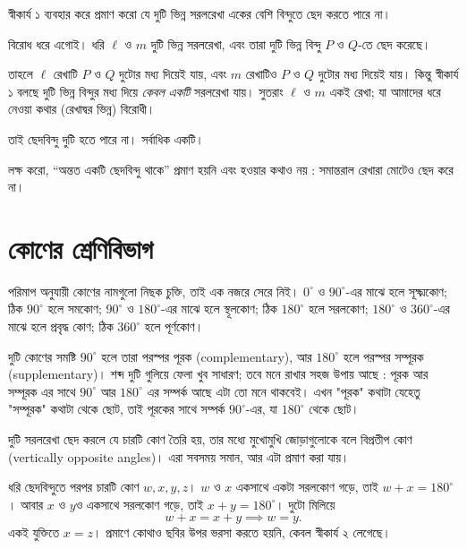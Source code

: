 \documentclass[11pt]{article}
\begin{document}
 স্বীকার্য ১ ব্যবহার করে প্রমাণ করো যে দুটি ভিন্ন সরলরেখা একের বেশি
বিন্দুতে ছেদ করতে পারে না।

\begin{sol}
বিরোধ ধরে এগোই। ধরি $\ell$ ও $m$ দুটি ভিন্ন সরলরেখা, এবং তারা দুটি ভিন্ন বিন্দু
$P$ ও $Q$-তে ছেদ করেছে।

তাহলে $\ell$ রেখাটি $P$ ও $Q$ দুটোর মধ্য দিয়েই যায়, এবং $m$ রেখাটিও $P$ ও $Q$
দুটোর মধ্য দিয়েই যায়। কিন্তু স্বীকার্য ১ বলছে দুটি ভিন্ন বিন্দুর মধ্য দিয়ে
\emph{কেবল একটি} সরলরেখা যায়। সুতরাং $\ell$ ও $m$ একই রেখা; যা আমাদের ধরে
নেওয়া কথার (রেখাদ্বর ভিন্ন) বিরোধী।

তাই ছেদবিন্দু দুটি হতে পারে না। সর্বাধিক একটি।

লক্ষ করো, ``অন্তত একটি ছেদবিন্দু থাকে'' প্রমাণ হয়নি এবং হওয়ার কথাও নয় : সমান্তরাল রেখারা
মোটেও ছেদ করে না।
\end{sol}

\section{কোণের শ্রেণিবিভাগ}

\noindent
পরিমাপ অনুযায়ী কোণের নামগুলো নিছক চুক্তি, তাই এক নজরে সেরে নিই। $0^\circ$ ও
$90^\circ$-এর মাঝে হলে সূক্ষ্মকোণ; ঠিক $90^\circ$ হলে সমকোণ; $90^\circ$ ও
$180^\circ$-এর মাঝে হলে স্থূলকোণ; ঠিক $180^\circ$ হলে সরলকোণ; $180^\circ$ ও
$360^\circ$-এর মাঝে হলে প্রবৃদ্ধ কোণ; ঠিক $360^\circ$ হলে পূর্ণকোণ।

দুটি কোণের সমষ্টি $90^\circ$ হলে তারা পরস্পর পূরক (complementary), আর
$180^\circ$ হলে পরস্পর সম্পূরক (supplementary)। শব্দ দুটি গুলিয়ে ফেলা খুব সাধারণ; তবে মনে রাখার সহজ উপায় আছে : পূরক আর সম্পূরক এর সাথে $90^\circ$ আর $180^\circ$ এর সম্পর্ক আছে এটা তো মনে থাকবেই। এখন "পূরক" কথাটা যেহেতু "সম্পূরক" কথাটা থেকে ছোট, তাই পূরকের সাথে সম্পর্ক $90^\circ$-এর, যা $180^\circ$ থেকে ছোট।

\begin{idea}[বিপ্রতীপ কোণ সমান]
দুটি সরলরেখা ছেদ করলে যে চারটি কোণ তৈরি হয়, তার মধ্যে মুখোমুখি জোড়াগুলোকে বলে
বিপ্রতীপ কোণ (vertically opposite angles)। এরা সবসময় সমান, আর এটা প্রমাণ করা যায়।

ধরি ছেদবিন্দুতে পরপর চারটি কোণ $w, x, y, z$। $w$ ও $x$ একসাথে একটা সরলকোণ গড়ে,
তাই $w + x = 180^\circ$। আবার $x$ ও $y$ও একসাথে সরলকোণ গড়ে, তাই
$x + y = 180^\circ$। দুটো মিলিয়ে
\[
  w + x = x + y \implies w = y .
\]
একই যুক্তিতে $x = z$। প্রমাণে কোথাও ছবির উপর ভরসা করতে হয়নি, কেবল স্বীকার্য ২
লেগেছে।
\end{idea}
\end{document}
